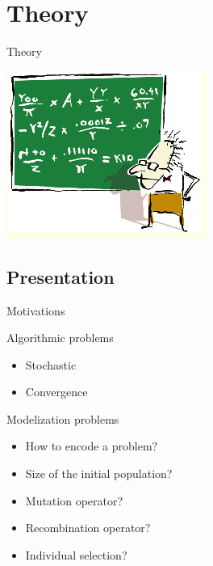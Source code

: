 \section{Theory}

\begin{frame}{Theory}
  \begin{center}
    \includegraphics{img/theory}
  \end{center}
\end{frame}

\subsection{Presentation}

\begin{frame}{Motivations}
  \begin{block}{Algorithmic problems}
    \begin{itemize}
      \item Stochastic
      \item Convergence
    \end{itemize}
  \end{block}

  \begin{block}{Modelization problems}
    \begin{itemize}
      \item How to encode a problem?
      \item Size of the initial population?
      \item Mutation operator?
      \item Recombination operator?
      \item Individual selection?
    \end{itemize}
  \end{block}
\end{frame}

